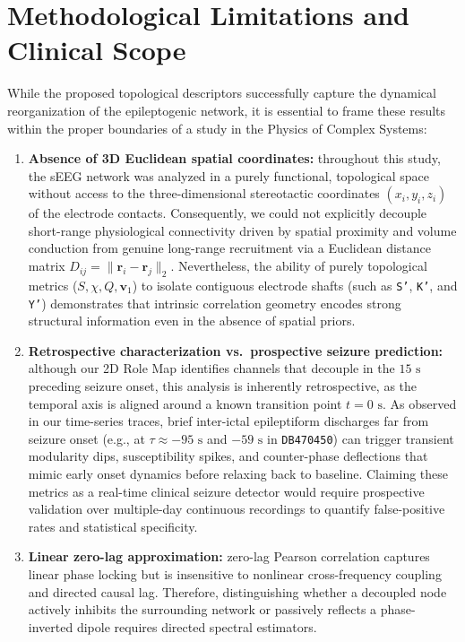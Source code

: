 \section{Methodological Limitations and Clinical Scope}
\label{sec:limitations}

While the proposed topological descriptors successfully capture the dynamical reorganization of the epileptogenic network, it is essential to frame these results within the proper boundaries of a study in the Physics of Complex Systems:

\begin{enumerate}
    \item \textbf{Absence of 3D Euclidean spatial coordinates:} throughout this study, the sEEG network was analyzed in a purely functional, topological space without access to the three-dimensional stereotactic coordinates $(x_i, y_i, z_i)$ of the electrode contacts. Consequently, we could not explicitly decouple short-range physiological connectivity driven by spatial proximity and volume conduction from genuine long-range recruitment via a Euclidean distance matrix $D_{ij} = \|\mathbf{r}_i - \mathbf{r}_j\|_2$. Nevertheless, the ability of purely topological metrics ($S, \chi, Q, \mathbf{v}_1$) to isolate contiguous electrode shafts (such as \texttt{S'}, \texttt{K'}, and \texttt{Y'}) demonstrates that intrinsic correlation geometry encodes strong structural information even in the absence of spatial priors.
    \item \textbf{Retrospective characterization vs.\ prospective seizure prediction:} although our 2D Role Map identifies channels that decouple in the $15\text{ s}$ preceding seizure onset, this analysis is inherently retrospective, as the temporal axis is aligned around a known transition point $t = 0\text{ s}$. As observed in our time-series traces, brief inter-ictal epileptiform discharges far from seizure onset (e.g., at $\tau \approx -95\text{ s}$ and $-59\text{ s}$ in \texttt{DB470450}) can trigger transient modularity dips, susceptibility spikes, and counter-phase deflections that mimic early onset dynamics before relaxing back to baseline. Claiming these metrics as a real-time clinical seizure detector would require prospective validation over multiple-day continuous recordings to quantify false-positive rates and statistical specificity.
    \item \textbf{Linear zero-lag approximation:} zero-lag Pearson correlation captures linear phase locking but is insensitive to nonlinear cross-frequency coupling and directed causal lag. Therefore, distinguishing whether a decoupled node actively inhibits the surrounding network or passively reflects a phase-inverted dipole requires directed spectral estimators.
\end{enumerate}